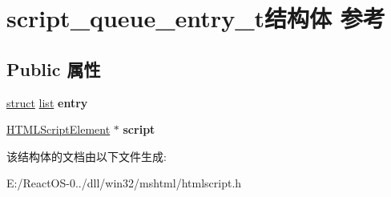 \hypertarget{structscript__queue__entry__t}{}\section{script\+\_\+queue\+\_\+entry\+\_\+t结构体 参考}
\label{structscript__queue__entry__t}
\subsection*{Public 属性}
\begin{DoxyCompactItemize}
\item 
\mbox{\label{structscript__queue__entry__t_a5b5c354d504b4859d801e96cf5e3735a}} 
\hyperlink{interfacestruct}{struct} \hyperlink{classlist}{list} {\bfseries entry}
\item 
\mbox{\label{structscript__queue__entry__t_a86b08c5cd8db6d59bc19b2ec05703672}} 
\hyperlink{struct_h_t_m_l_script_element}{H\+T\+M\+L\+Script\+Element} $\ast$ {\bfseries script}
\end{DoxyCompactItemize}


该结构体的文档由以下文件生成\+:\begin{DoxyCompactItemize}
\item 
E\+:/\+React\+O\+S-\/0../dll/win32/mshtml/htmlscript.\+h\end{DoxyCompactItemize}

